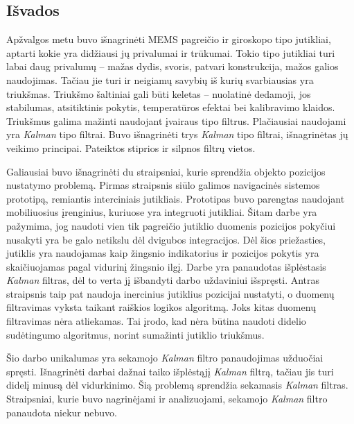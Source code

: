 \subsection{Išvados}

Apžvalgos metu buvo išnagrinėti MEMS pagreičio ir giroskopo tipo jutikliai, aptarti kokie yra didžiausi jų privalumai ir trūkumai.
Tokio tipo jutikliai turi labai daug privalumų -- mažas dydis, svoris, patvari konstrukcija, mažos galios naudojimas.
Tačiau jie turi ir neigiamų savybių iš kurių svarbiausias yra triukšmas.
Triukšmo šaltiniai gali būti keletas -- nuolatinė dedamoji, jos stabilumas, atsitiktinis pokytis, temperatūros efektai bei kalibravimo klaidos.
Triukšmus galima mažinti naudojant įvairaus tipo filtrus.
Plačiausiai naudojami yra \textit{Kalman} tipo filtrai.
Buvo išnagrinėti trys \textit{Kalman} tipo filtrai, išnagrinėtas jų veikimo principai.
Pateiktos stiprios ir silpnos filtrų vietos.

Galiausiai buvo išnagrinėti du straipsniai, kurie sprendžia objekto pozicijos nustatymo problemą.
Pirmas straipsnis siūlo galimos navigacinės sistemos prototipą, remiantis interciniais jutikliais.
Prototipas buvo parengtas naudojant mobiliuosius įrenginius, kuriuose yra integruoti jutikliai.
Šitam darbe yra pažymima, jog naudoti vien tik pagreičio jutiklio duomenis pozicijos pokyčiui nusakyti yra be galo netikslu dėl dvigubos integracijos.
Dėl šios priežasties, jutiklis yra naudojamas kaip žingsnio indikatorius ir pozicijos pokytis yra skaičiuojamas pagal vidurinį žingsnio ilgį.
Darbe yra panaudotas išplėstasis \textit{Kalman} filtras, dėl to verta jį išbandyti darbo uždaviniui išspręsti.
Antras straipsnis taip pat naudoja inercinius jutiklius pozicijai nustatyti, o duomenų filtravimas vyksta taikant raiškios logikos algoritmą.
Joks kitas duomenų filtravimas nėra atliekamas.
Tai įrodo, kad nėra būtina naudoti didelio sudėtingumo algoritmus, norint sumažinti jutiklio triukšmus.

Šio darbo unikalumas yra sekamojo \textit{Kalman} filtro panaudojimas užduočiai spręsti. 
Išnagrinėti darbai dažnai taiko išplėstąjį \textit{Kalman} filtrą, tačiau jis turi didelį minusą dėl vidurkinimo.
Šią problemą sprendžia sekamasis \textit{Kalman} filtras.
Straipsniai, kurie buvo nagrinėjami ir analizuojami, sekamojo \textit{Kalman} filtro panaudota niekur nebuvo.